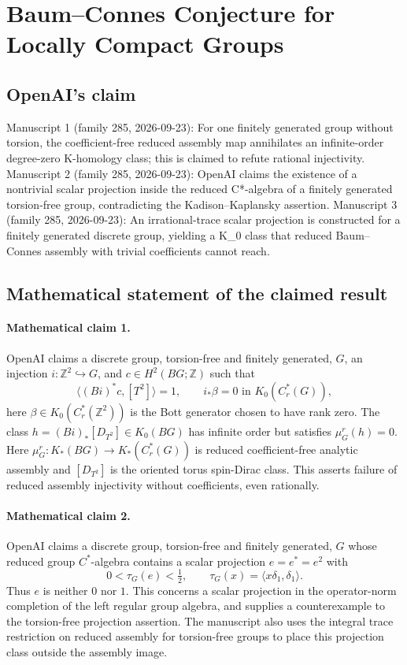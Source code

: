 \documentclass[11pt]{article}
\begin{document}
\section*{Baum–Connes Conjecture for Locally Compact Groups}

\subsection{OpenAI's claim}
Manuscript 1 (family 285, 2026-09-23): For one finitely generated group without torsion, the coefficient-free reduced assembly map annihilates an infinite-order degree-zero K-homology class; this is claimed to refute rational injectivity. Manuscript 2 (family 285, 2026-09-23): OpenAI claims the existence of a nontrivial scalar projection inside the reduced C*-algebra of a finitely generated torsion-free group, contradicting the Kadison--Kaplansky assertion. Manuscript 3 (family 285, 2026-09-23): An irrational-trace scalar projection is constructed for a finitely generated discrete group, yielding a K\_0 class that reduced Baum--Connes assembly with trivial coefficients cannot reach.

\subsection{Mathematical statement of the claimed result}
\paragraph{Mathematical claim 1.} OpenAI claims a discrete group, torsion-free and finitely generated, $G$, an injection $i:\mathbb Z^2\hookrightarrow G$, and $c\in H^2(BG;\mathbb Z)$ such that
\[
\langle(Bi)^*c,[T^2]\rangle=1,\qquad
 i_*\beta=0\text{ in }K_0(C_r^*(G)),
\]
here $\beta\in K_0(C_r^*(\mathbb Z^2))$ is the Bott generator chosen to have rank zero. The class $h=(Bi)_*[D_{T^2}]\in K_0(BG)$ has infinite order but satisfies $\mu_G^r(h)=0$. Here $\mu_G^r:K_*(BG)\to K_*(C_r^*(G))$ is reduced coefficient-free analytic assembly and $[D_{T^2}]$ is the oriented torus spin-Dirac class. This asserts failure of reduced assembly injectivity without coefficients, even rationally.

\paragraph{Mathematical claim 2.} OpenAI claims a discrete group, torsion-free and finitely generated, $G$ whose reduced group $C^*$-algebra contains a scalar projection $e=e^*=e^2$ with
\[
0<\tau_G(e)<\tfrac12,\qquad\tau_G(x)=\langle x\delta_1,\delta_1\rangle.
\]
Thus $e$ is neither $0$ nor $1$. This concerns a scalar projection in the operator-norm completion of the left regular group algebra, and supplies a counterexample to the torsion-free projection assertion. The manuscript also uses the integral trace restriction on reduced assembly for torsion-free groups to place this projection class outside the assembly image.
\end{document}
